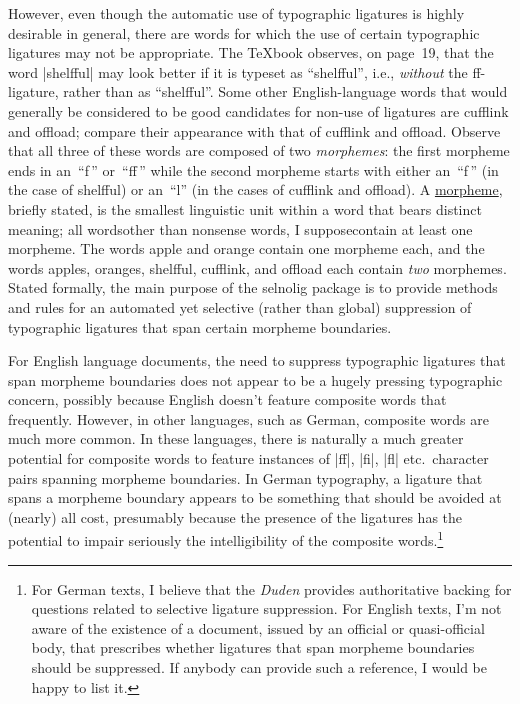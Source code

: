 \documentclass[11pt]{article}
\newcommand{\pkg}[1]{\textsf{#1}}
\begin{document}
However, even though the automatic use of typographic ligatures is highly desirable in general, there are words for which the use of certain typographic ligatures may not be appropriate. The \TeX book observes, on page~19, that the word |shelfful| may look better if it is typeset as \enquote{shelfful}, i.e., \emph{without} the ff-ligature, rather than as \enquote{\mbox{shelfful}}. Some other English-language words that would generally be considered to be good candidates for non-use of ligatures are \mbox{cufflink} and \mbox{offload}; compare their appearance with that of cufflink and offload. Observe that all three of these words are composed of two \emph{morphemes}: the first morpheme ends in an~\enquote{f\,} or~\enquote{ff\,} while the second morpheme starts with either an~\enquote{f\,} (in the case of shelfful) or an~\enquote{l} (in the cases of cufflink and offload). A \href{http://en.wikipedia.org/wiki/Morpheme}{morpheme}, briefly stated, is the smallest linguistic unit within a word that bears distinct meaning; all words\textemdash other than nonsense words, I suppose\textemdash contain at least one morpheme. The words apple and orange contain one morpheme each, and the words apples, oranges, shelfful, cufflink, and offload each contain \emph{two} morphemes. Stated formally, the main purpose of the \pkg{selnolig} package is to provide methods and rules for an automated yet selective (rather than global) suppression of typographic ligatures that span certain morpheme boundaries.

For English language documents, the need to suppress typographic ligatures that span morpheme boundaries does not appear to be a hugely pressing typographic concern, possibly because English doesn't feature composite words that frequently. However, in other languages, such as German, composite words are much more common. In these languages, there is naturally a much greater potential for composite words to feature instances of |ff|, |fi|, |fl| etc.\ character pairs spanning morpheme boundaries. In German typography, a ligature that spans a morpheme boundary appears to be something that should be avoided at (nearly) all cost, presumably because the presence of the ligatures has the potential to impair seriously the intelligibility of the composite words.\footnote{For German texts, I believe that the \emph{Duden} provides authoritative backing for questions related to selective ligature suppression. For English texts, I'm not aware of the existence of a document, issued by an official or quasi-official body, that prescribes whether ligatures that span morpheme boundaries should be suppressed. If anybody can provide such a reference, I would be happy to list it.}
\end{document}
